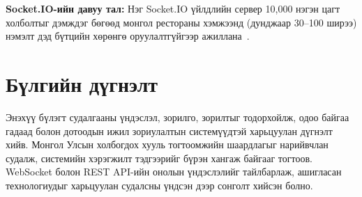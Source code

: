 \textbf{Socket.IO-ийн давуу тал:} Нэг Socket.IO үйлдлийн сервер 10,000 нэгэн цагт
холболтыг дэмждэг бөгөөд монгол рестораны хэмжээнд (дунджаар 30--100 ширээ)
нэмэлт дэд бүтцийн хөрөнгө оруулалтгүйгээр ажиллана~\cite{socketio2023}.

\section{Бүлгийн дүгнэлт}

Энэхүү бүлэгт судалгааны үндэслэл, зорилго, зорилтыг тодорхойлж, одоо байгаа
гадаад болон дотоодын ижил зориулалтын системүүдтэй харьцуулан дүгнэлт хийв.
Монгол Улсын холбогдох хууль тогтоомжийн шаардлагыг нарийвчлан судалж, системийн
хэрэгжилт тэдгээрийг бүрэн хангаж байгааг тогтоов. WebSocket болон REST API-ийн
онолын үндэслэлийг тайлбарлаж, ашигласан технологиудыг харьцуулан судалсны үндсэн
дээр сонголт хийсэн болно.
